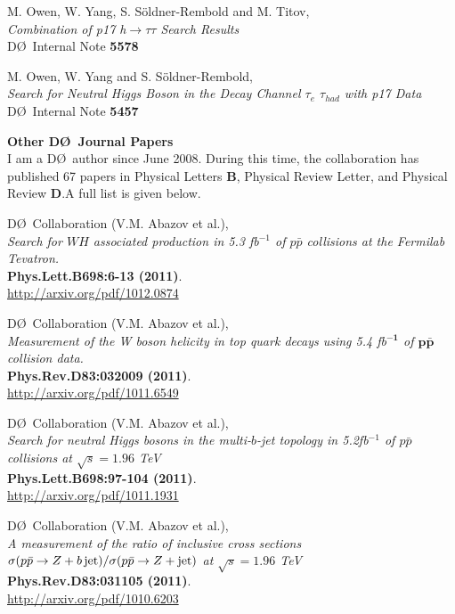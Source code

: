 \documentclass[12pt]{article}
\begin{document}
M. Owen, W. Yang, S. S\"oldner-Rembold and M. Titov,\\
 \textsl{
Combination of p17 h$\rightarrow\tau\tau$ Search Results }\\
{\small{D\O~Internal Note {\bf 5578}}}\vspace{2mm}

M. Owen, W. Yang and S. S\"oldner-Rembold, \\
\textsl{
Search for Neutral Higgs Boson in the Decay Channel $\tau_{e}$ $\tau_{had}$ with p17 Data }\\
{\small{D\O~Internal Note {\bf 5457}}}\vspace{2mm}

\textbf{\large Other D\O~Journal Papers}\vspace{2mm}\\
I am a D\O~author since June 2008. During this time, the collaboration has published 67 papers in Physical Letters \textbf{B}, Physical Review Letter, and Physical Review \textbf{D}.A full list is given below.\vspace{4mm}

%
D\O~Collaboration (V.M. Abazov et al.), \\
\textsl{Search for $WH$ associated production in 5.3 fb$^{-1}$ of $p\bar{p}$ collisions at the Fermilab Tevatron.}\\
\textbf{Phys.Lett.B698:6-13 (2011)}.\\
{\small{\url{http://arxiv.org/pdf/1012.0874}}}\vspace{4mm}

D\O~Collaboration (V.M. Abazov et al.), \\
\textsl{Measurement of the W boson helicity in top quark decays using 5.4 fb$^{\boldsymbol{-1}}$ of $\boldsymbol{p\bar{p}}$ collision data.}\\
\textbf{ Phys.Rev.D83:032009 (2011)}.\\
{\small{\url{http://arxiv.org/pdf/1011.6549}}}\vspace{4mm}

D\O~Collaboration (V.M. Abazov et al.), \\
\textsl{Search for neutral Higgs bosons in the multi-$b$-jet topology in 5.2fb$^{-1}$ of $p\bar{p}$ collisions at $\sqrt{s} = 1.96$ TeV}\\
\textbf{Phys.Lett.B698:97-104 (2011)}.\\
{\small{\url{http://arxiv.org/pdf/1011.1931}}}\vspace{4mm}

D\O~Collaboration (V.M. Abazov et al.), \\
\textsl{A measurement of the ratio of inclusive cross sections $\sigma(p\bar{p}\rightarrow Z+b{\rm\, jet})/ \sigma(p\bar{p}\rightarrow Z+{\rm jet})$ at $\sqrt{s}=1.96$ TeV}\\
\textbf{ Phys.Rev.D83:031105 (2011)}.\\
{\small{\url{http://arxiv.org/pdf/1010.6203}}}\vspace{4mm}
\end{document}
